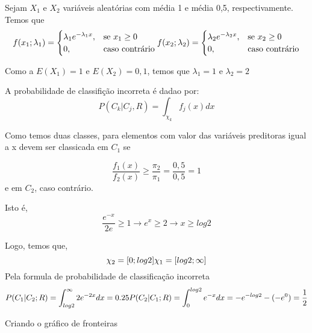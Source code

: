 \documentclass[
]{article}
\begin{document}
Sejam \(X_1\) e \(X_2\) variáveis aleatórias com média 1 e média 0,5,
respectivamente. Temos que \begin{equation}
f(x_1;\lambda_1)=
\begin{cases}
\lambda_1 e^{-\lambda_1 x}, & \text{se}\ x_1 \geq 0 \\
0, & \text{caso contrário}
\end{cases}
\\
f(x_2;\lambda_2)=
\begin{cases}
\lambda_2 e^{-\lambda_2 x}, & \text{se}\ x_2 \geq 0 \\
0, & \text{caso contrário}
\end{cases}
\end{equation}

Como a \(E(X_1) = 1\) e \(E(X_2) = 0,1\), temos que \(\lambda_1 = 1\) e
\(\lambda_2 = 2\)

A probabilidade de classifição incorreta é dadao por: \begin{equation}
P(C_k | C_j, R) = \int_{\chi_k} f_j(x) dx
\end{equation}

Como temos duas classes, para elementos com valor das variáveis
preditoras igual a x devem ser classicada em \(C_1\) se

\begin{equation}
\frac{f_1(x)}{f_2(x)} \geq \frac{\pi_2}{\pi_1} = \frac{0,5}{0,5} = 1
\end{equation} e em \(C_2\), caso contrário.

Isto é, \begin{equation}
\frac{e^{-x}}{2e} \geq 1 \longrightarrow
e^x \geq 2 \longrightarrow
x \geq log2
\end{equation}

Logo, temos que, \begin{equation}
\chi_2= [0; log2] \\
\chi_1 = [log2;\infty] \\

\end{equation} Pela formula de probabilidade de classificação incorreta
\begin{equation}
P(C_1 | C_2; R) = \int^\infty_{log2}2e^{-2x}dx = 0.25\\
P(C_2 | C_1; R) = \int^{log2}_{0}e^{-x}dx = -e^{-log2} - (-e^0 ) = \frac{1}{2} \\

\end{equation}

Criando o gráfico de fronteiras
\end{document}
